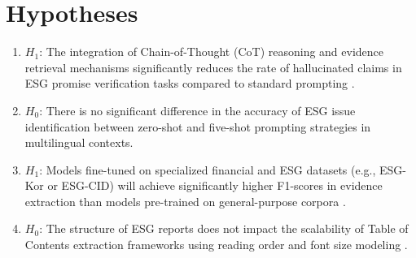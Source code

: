 \documentclass{article}
\begin{document}
\section{Hypotheses}
\begin{enumerate}
\item $H_1$: The integration of Chain-of-Thought (CoT) reasoning and evidence retrieval mechanisms significantly reduces the rate of hallucinated claims in ESG promise verification tasks compared to standard prompting \citep{Is the Answer in the Text? Challenging ChatGPT with Evidence Retrieval from Instructive Text, Multilingual Promise Verification in ESG Reports with Large Language Model Performance Evaluation}.
\item $H_0$: There is no significant difference in the accuracy of ESG issue identification between zero-shot and five-shot prompting strategies in multilingual contexts.
\item $H_1$: Models fine-tuned on specialized financial and ESG datasets (e.g., ESG-Kor or ESG-CID) will achieve significantly higher F1-scores in evidence extraction than models pre-trained on general-purpose corpora \citep{ESG-Kor: A Korean Dataset for ESG-related Information Extraction and Practical Use Cases, Enhancing Retrieval for ESGLLM via ESG-CID: A Disclosure Content Index Finetuning Dataset for Mapping GRI and ESRS}.
\item $H_0$: The structure of ESG reports does not impact the scalability of Table of Contents extraction frameworks using reading order and font size modeling \citep{A Scalable Framework for Table of Contents Extraction from Complex ESG Annual Reports}.
\end{enumerate}
\end{document}
